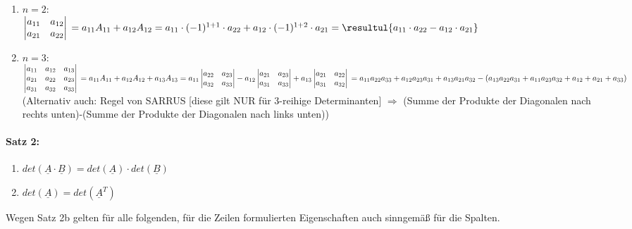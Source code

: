 \begin{enumerate}[label=\alph*.)]
\item $n=2$: \\
$\begin{vmatrix}
a_{11} &  a_{12}\\
a_{21} &a_{22}
\end{vmatrix}\\
=a_{11}A_{11}+a_{12}A_{12}=a_{11}\cdot (-1)^{1+1}\cdot a_{22}+a_{12}\cdot(-1)^{1+2}\cdot a_{21}\\
=\resultul{a_{11}\cdot a_{22}-a_{12}\cdot a_{21}}$
\item $n=3$: \\
$\begin{vmatrix}
a_{11} &  a_{12} & a_{13}\\
a_{21} &a_{22} & a_{23}\\
a_{31} & a_{32} & a_{33}
\end{vmatrix}\\
=a_{11}A_{11}+a_{12}A_{12}+a_{13}A_{13}\\
=a_{11} \begin{vmatrix}
a_{22} & a_{23}\\
a_{32} & a_{33}\\
\end{vmatrix}-a_{12}\begin{vmatrix}
a_{21} & a_{23}\\
a_{31} & a_{33}
\end{vmatrix}+a_{13} \begin{vmatrix}
a_{21} & a_{22}\\
a_{31} & a_{32}
\end{vmatrix}\\
=a_{11}a_{22}a_{33}+a_{12} a_{23}a_{31}+a_{13} a_{21} a_{32}-(a_{13} a_{22} a_{31}+a_{11}a_{23}a_{32}+a_{12}+a_{21}+a_{33})
$\medskip\\
(Alternativ auch: Regel von SARRUS [diese gilt NUR für 3-reihige Determinanten] $\Rightarrow$ (Summe der Produkte der Diagonalen nach rechts unten)-(Summe der Produkte der Diagonalen nach links unten))
\end{enumerate}
\paragraph{Satz 2:}
\begin{enumerate}[label=\alph*.)]
\item $det(\underline{A}\cdot \underline{B}) = det (\underline{A})\cdot det(\underline{B})$
\item $det(\underline{A})=det(\underline{A}^T)$
\end{enumerate}
Wegen Satz 2b gelten für alle folgenden, für die Zeilen formulierten Eigenschaften auch sinngemäß für die Spalten.
